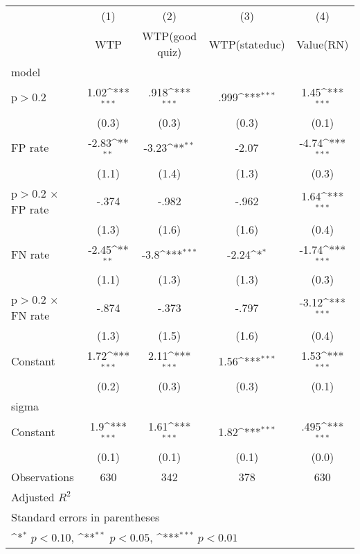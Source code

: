 {
\def\sym#1{\ifmmode^{#1}\else\(^{#1}\)\fi}
\begin{tabular}{l*{4}{c}}
\hline\hline
                &\multicolumn{1}{c}{(1)}&\multicolumn{1}{c}{(2)}&\multicolumn{1}{c}{(3)}&\multicolumn{1}{c}{(4)}\\
                &\multicolumn{1}{c}{WTP}&\multicolumn{1}{c}{WTP(good quiz)}&\multicolumn{1}{c}{WTP(stateduc)}&\multicolumn{1}{c}{Value(RN)}\\
\hline
model           &                  &                  &                  &                  \\
p$>$0.2         &     1.02\sym{***}&     .918\sym{***}&     .999\sym{***}&     1.45\sym{***}\\
                &    (0.3)         &    (0.3)         &    (0.3)         &    (0.1)         \\
FP rate         &    -2.83\sym{**} &    -3.23\sym{**} &    -2.07         &    -4.74\sym{***}\\
                &    (1.1)         &    (1.4)         &    (1.3)         &    (0.3)         \\
p$>$0.2 $\times$ FP rate&    -.374         &    -.982         &    -.962         &     1.64\sym{***}\\
                &    (1.3)         &    (1.6)         &    (1.6)         &    (0.4)         \\
FN rate         &    -2.45\sym{**} &     -3.8\sym{***}&    -2.24\sym{*}  &    -1.74\sym{***}\\
                &    (1.1)         &    (1.3)         &    (1.3)         &    (0.3)         \\
p$>$0.2 $\times$ FN rate&    -.874         &    -.373         &    -.797         &    -3.12\sym{***}\\
                &    (1.3)         &    (1.5)         &    (1.6)         &    (0.4)         \\
Constant        &     1.72\sym{***}&     2.11\sym{***}&     1.56\sym{***}&     1.53\sym{***}\\
                &    (0.2)         &    (0.3)         &    (0.3)         &    (0.1)         \\
\hline
sigma           &                  &                  &                  &                  \\
Constant        &      1.9\sym{***}&     1.61\sym{***}&     1.82\sym{***}&     .495\sym{***}\\
                &    (0.1)         &    (0.1)         &    (0.1)         &    (0.0)         \\
\hline
Observations    &      630         &      342         &      378         &      630         \\
Adjusted \(R^{2}\)&                  &                  &                  &                  \\
\hline\hline
\multicolumn{5}{l}{\footnotesize Standard errors in parentheses}\\
\multicolumn{5}{l}{\footnotesize \sym{*} \(p<0.10\), \sym{**} \(p<0.05\), \sym{***} \(p<0.01\)}\\
\end{tabular}
}
